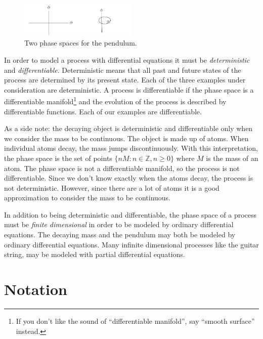 \begin{figure}[tb!]
  \begin{center}
    \includegraphics[width=0.5\textwidth]{ode/introduction/pendulum_phase_space}
  \end{center}
  \caption{Two phase spaces for the pendulum.}
  \label{figure pendulum phase space}
\end{figure}


In order to model a process with differential equations it must be 
\textit{deterministic}
and \textit{differentiable}.  Deterministic means that all past and future
states of the process are determined by its present state.  Each of the 
three examples under consideration are deterministic.  A process is 
differentiable if the phase space is a 
differentiable manifold\footnote{If you don't like the sound of 
``differentiable manifold'', say ``smooth surface'' instead.}
and the evolution of the process is described by differentiable functions.  
Each of our examples are differentiable.

As a side note: the decaying object is deterministic and differentiable 
only when we consider the mass to be continuous.  The object is made up
of atoms.  When individual atoms decay, the mass jumps discontinuously.
With this interpretation, the phase space is the set of points 
$\{ n M : n \in \mathbb{Z}, n \geq 0\}$ where $M$ is the mass of an atom.  The 
phase space is not a differentiable manifold, so the process is not 
differentiable.  Since we don't know exactly when the atoms decay, 
the process is not deterministic.  However, since there are a lot of atoms
it is a good approximation to consider the mass to be continuous.


In addition to being deterministic and differentiable, the phase space of 
a process must be \textit{finite dimensional} in order to be modeled by 
ordinary differential equations.  The decaying mass and the pendulum 
may both be modeled by ordinary differential equations.
Many infinite dimensional processes like the guitar string, may be modeled 
with partial differential equations.




\section{Notation}

